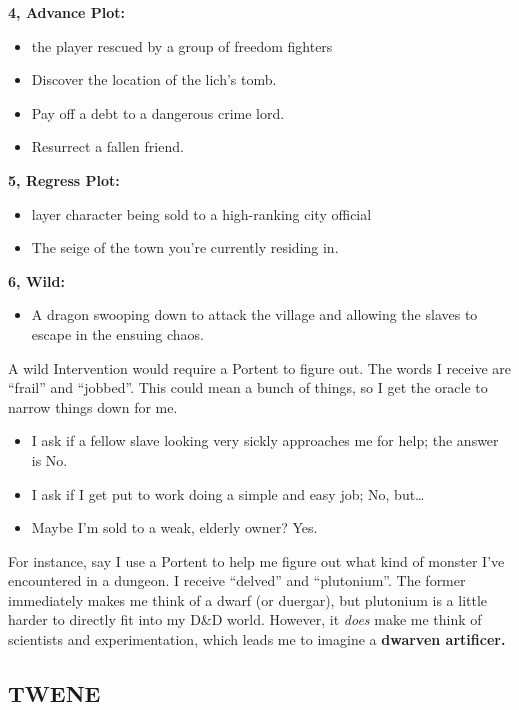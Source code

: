 \documentclass[12pt, letterpaper]{article}
\begin{document}
\noindent\textbf{4, Advance Plot:}
\begin{itemize}[noitemsep, topsep=0pt]
\item the player rescued by a group of freedom fighters
\item Discover the location of the lich's tomb.
\item Pay off a debt to a dangerous crime lord.
\item Resurrect a fallen friend.
\end{itemize}


\noindent\textbf{5, Regress Plot:}
\begin{itemize}[noitemsep, topsep=0pt]
\item layer character being sold to a high-ranking city official
\item The seige of the town you're currently residing in.
\end{itemize}

\noindent\textbf{6, Wild:}
\begin{itemize}[noitemsep, topsep=0pt]
\item A dragon swooping down to attack the village and allowing the slaves to escape in the ensuing chaos.
\end{itemize}

A wild Intervention would require a Portent to figure out. The words I receive are ``frail'' and ``jobbed''. This could mean a bunch of things, so I get the oracle to narrow things down for me.
\begin{itemize}[noitemsep, topsep=0pt]
\item I ask if a fellow slave looking very sickly approaches me for help; the answer is No.
\item I ask if I get put to work doing a simple and easy job; No, but\ldots
\item Maybe I'm sold to a weak, elderly owner? Yes.
\end{itemize}

For instance, say I use a Portent to help me figure out what kind of monster I've encountered in a dungeon. I receive ``delved'' and ``plutonium''. The former immediately makes me think of a dwarf (or duergar), but plutonium is a little harder to directly fit into my D\&D world. However, it \textit{does} make me think of scientists and experimentation, which leads me to imagine a \textbf{dwarven artificer.}

\subsection*{TWENE}
\end{document}
